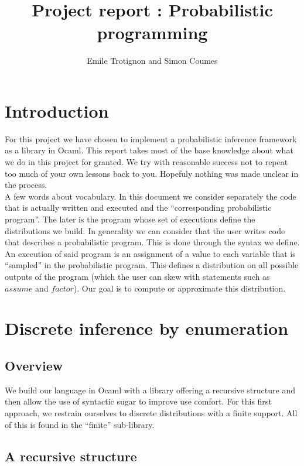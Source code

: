 \documentclass{article}
\title{Project report : Probabilistic programming}
\author{Emile Trotignon and Simon Coumes}
\begin{document}
\maketitle

\section{Introduction}

	For this project we have chosen to implement a probabilistic inference framework as a library in Ocaml.
	This report takes most of the base knowledge about what we do in this project for granted.
	We try with reasonable success not to repeat too much of your own lessons back to you. 
	Hopefuly nothing was made unclear in the process. \\

	A few words about vocabulary.
	In this document we consider separately the code that is actually written and executed and the ``corresponding probabilistic program''.
	The later is the program whose set of executions define the distributions we build.
	In generality we can consider that the user writes code that describes a probabilistic program. 
	This is done through the syntax we define.
	An execution of said program is an assignment of a value to each variable that is ``sampled'' in the probabilistic program. 
	This defines a distribution on all possible outputs of the program (which the user can skew with statements such as $assume$ and $factor$). Our goal is to compute or approximate this distribution. 



\section{Discrete inference by enumeration}

	\subsection{Overview}

	We build our language in Ocaml with a library offering a recursive structure and then allow the use of syntactic sugar to improve use comfort.
	For this first approach, we restrain ourselves to discrete distributions with a finite support. 
	All of this is found in the ``finite'' sub-library. \\

	\subsection{A recursive structure}
\end{document}
